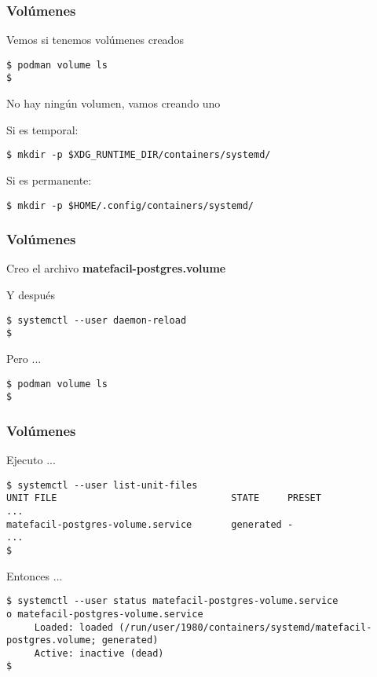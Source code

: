 \begin{frame}[fragile]
  \frametitle{Volúmenes}

  Vemos si tenemos volúmenes creados

  \begin{lstlisting}
$ podman volume ls
$
  \end{lstlisting}

  No hay ningún volumen, vamos creando uno

  \pausa
  \begin{exampleblock}{Si es temporal:}
    \begin{lstlisting}
$ mkdir -p $XDG_RUNTIME_DIR/containers/systemd/
    \end{lstlisting}
  \end{exampleblock}
  \pausa
  \begin{block}{Si es permanente:}
    \begin{lstlisting}
$ mkdir -p $HOME/.config/containers/systemd/
    \end{lstlisting}
  \end{block}
\end{frame}

\begin{frame}[fragile]
  \frametitle{Volúmenes}
  Creo el archivo \textbf{matefacil-postgres.volume}
  \pausa
  
  \pausa
  Y después
  \begin{lstlisting}
$ systemctl --user daemon-reload
$
  \end{lstlisting}
  \pausa
  Pero ...
  \begin{lstlisting}
$ podman volume ls
$
  \end{lstlisting}
\end{frame}

\begin{frame}[fragile]
  \frametitle{Volúmenes}
  Ejecuto ...
  \begin{lstlisting}
$ systemctl --user list-unit-files
UNIT FILE                               STATE     PRESET 
...
matefacil-postgres-volume.service       generated -
...
$
  \end{lstlisting}
  \pausa
  Entonces ...
  \begin{lstlisting}
$ systemctl --user status matefacil-postgres-volume.service
o matefacil-postgres-volume.service
     Loaded: loaded (/run/user/1980/containers/systemd/matefacil-postgres.volume; generated)
     Active: inactive (dead)
$
  \end{lstlisting}
\end{frame}

